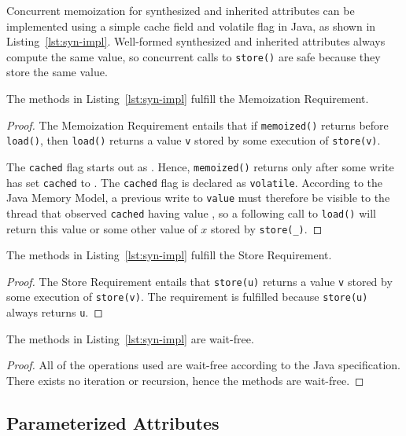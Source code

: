 {Concurrent memoization for synthesized and inherited attributes
can be implemented using a simple cache field and volatile flag in Java, as shown in
Listing~\ref{lst:syn-impl}.
Well-formed synthesized and inherited attributes always compute the same value,
so concurrent calls to \verb'store()' are safe because they store the same value.

\begin{theorem}
  The methods in Listing~\ref{lst:syn-impl}
  fulfill the Memoization Requirement.
\end{theorem}

\begin{proof}
  The Memoization Requirement entails that
  if \verb'memoized()' returns \true{} before \verb'load()', then \verb'load()' returns
  a value \verb'v' stored by some execution of \verb'store(v)'.

  The \verb'cached' flag starts out as \false{}. Hence, \verb'memoized()'
  returns \true{} only after some write has set \verb'cached' to \true{}.
  The \verb'cached' flag is declared as \verb'volatile'.
  According to the Java Memory Model, a previous write to \verb'value' must
  therefore be visible to the thread that observed \verb'cached' having value \true{},
  so a following call to \verb'load()' will return this value or some other value of
  $x$ stored by \verb'store(_)'.
\end{proof}

\begin{theorem}
  The methods in Listing~\ref{lst:syn-impl}
  fulfill the Store Requirement.
\end{theorem}

\begin{proof}
  The Store Requirement entails that
  \verb'store(u)' returns a value \verb'v' stored by some execution of \verb'store(v)'.
  The requirement is fulfilled because \verb'store(u)' always returns \verb'u'.
\end{proof}

\begin{theorem}
  The methods in Listing~\ref{lst:syn-impl} are wait-free.
\end{theorem}

\begin{proof}
  All of the operations used are wait-free according to the Java specification.
  There exists no iteration or recursion, hence the methods are wait-free.
\end{proof}


\subsection{Parameterized Attributes}
\label{par-compute}

}
